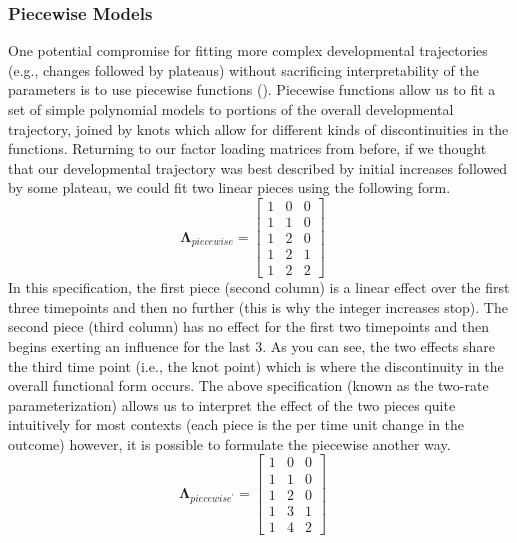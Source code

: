 \documentclass[11pt]{article}
\begin{document}
\subsubsection{Piecewise Models}
One potential compromise for fitting more complex developmental trajectories (e.g., changes followed by plateaus) without sacrificing interpretability of the parameters is to use piecewise functions (\cite{flora_specifying_2008}). Piecewise functions allow us to fit a set of simple polynomial models to portions of the overall developmental trajectory, joined by knots which allow for different kinds of discontinuities in the functions. Returning to our factor loading matrices from before, if we thought that our developmental trajectory was best described by initial increases followed by some plateau, we could fit two linear pieces using the following form.
%
\begin{equation} \label{eq:18}
\boldsymbol{\Lambda}_{piecewise} = \left[ \begin{array}{cccc} 1 & 0 & 0 \\ 1 & 1 & 0 \\ 1 & 2 & 0 \\ 1 & 2 & 1 \\ 1 & 2 & 2 \end{array} \right] \quad
\end{equation}
%
In this specification, the first piece (second column) is a linear effect over the first three timepoints and then no further (this is why the integer increases stop). The second piece (third column) has no effect for the first two timepoints and then begins exerting an influence for the last 3. As you can see, the two effects share the third time point (i.e., the knot point) which is where the discontinuity in the overall functional form occurs. The above specification (known as the two-rate parameterization) allows us to interpret the effect of the two pieces quite intuitively for most contexts (each piece is the per time unit change in the outcome) however, it is possible to formulate the piecewise another way.
%
\begin{equation} \label{eq:19}
\boldsymbol{\Lambda}_{piecewise^{\prime}} = \left[ \begin{array}{cccc} 1 & 0 & 0 \\ 1 & 1 & 0 \\ 1 & 2 & 0 \\ 1 & 3 & 1 \\ 1 & 4 & 2 \end{array} \right] \quad
\end{equation}
\end{document}
